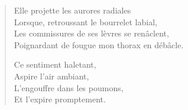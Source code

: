 \begin{verse}%
  \quatrain%
  Elle projette les aurores radiales\\  %
  Lorsque, retroussant le bourrelet labial,\\  %
  Les commissures de ses lèvres se renâclent,\\  %
  Poignardant de fougue mon thorax en débâcle.

  Ce sentiment haletant,\\  %
  Aspire l’air ambiant,\\  %
  L’engouffre dans les poumons,\\  %
  Et l’expire promptement.
\end{verse}


